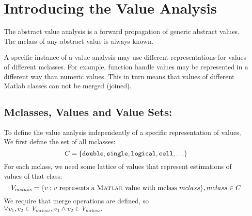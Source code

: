 \begin{comment}
The analysis is meant to be modular with respect to the abstraction of
values, so that the machinery of the analysis can be reused. This
allows more powerful, fine-grained value analyses, while only
requiring the specification of the new value abstraction and how they
behave with respect to indexing operations and Matlab builtin
functions. The builtin framework helps with the latter specification.

Any value abstraction must include the mclass of the estimated
value. The mclass is required because the Matlab function look-up
semantics depend on the mclass of arguments, due to the mclass
specialization semantics. Value abstractions that do not estimate
function handle values will result in missing call edges.

We provide an implementation of a value abstraction, which includes estimation
of function handle values, cell array values and structure
values. This abstraction can be used to build a complete call graph.

In the following section we will introduce our context-sensitive
interprocedural analysis framework, a high-level view of the value
analysis, and the specific value abstraction that is used to construct
complete callgraphs.}
\end{comment}


\section{Introducing the Value Analysis}
\label{sec:value}

The abstract value analysis is a forward propagation of generic
abstract \matlab values. The mclass of any abstract value is always
known.

A specific instance of a value analysis may use different
representations for values of different mclasses. For example,
function handle values may be represented in a different way than
numeric values. This in turn means that values of different Matlab
classes can not be merged (joined).

\subsection{Mclasses, Values and Value Sets:}

To define the value analysis independently of a specific
representation of values, 
We first define the set of all mclasses:
\begin{equation*}
C = \{ \text{\tt double},\text{\tt single},\text{\tt logical},\text{\tt cell},\ldots \}
\end{equation*}
For each mclass, we need some lattice of values that represent estimations of \matlab values of that class:
\begin{equation*}
V_{mclass} = \{v: v \text{ represents a \matlab value with mclass } mclass \}, mclass \in C
\end{equation*}
We require that merge operations are defined, so
$\forall v_1, v_2 \in V_{mclass}, v_1 \wedge v_2 \in V_{mclass}.$

